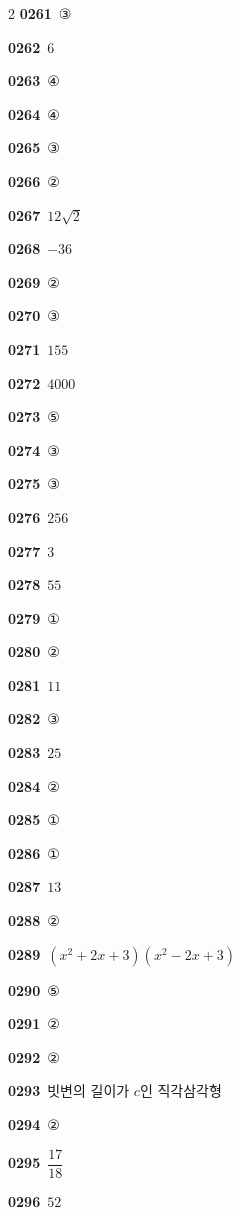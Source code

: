 \documentclass[10pt,a4paper]{article}
\begin{document}
\begin{multicols}{2}
\noindent\textbf{0261}\ ③\par
\noindent\textbf{0262}\ $6$\par
\noindent\textbf{0263}\ ④\par
\noindent\textbf{0264}\ ④\par
\noindent\textbf{0265}\ ③\par
\noindent\textbf{0266}\ ②\par
\noindent\textbf{0267}\ $12\sqrt{2}$\par
\noindent\textbf{0268}\ $-36$\par
\noindent\textbf{0269}\ ②\par
\noindent\textbf{0270}\ ③\par
\noindent\textbf{0271}\ $155$\par
\noindent\textbf{0272}\ $4000$\par
\noindent\textbf{0273}\ ⑤\par
\noindent\textbf{0274}\ ③\par
\noindent\textbf{0275}\ ③\par
\noindent\textbf{0276}\ $256$\par
\noindent\textbf{0277}\ $3$\par
\noindent\textbf{0278}\ $55$\par
\noindent\textbf{0279}\ ①\par
\noindent\textbf{0280}\ ②\par
\noindent\textbf{0281}\ $11$\par
\noindent\textbf{0282}\ ③\par
\noindent\textbf{0283}\ $25$\par
\noindent\textbf{0284}\ ②\par
\noindent\textbf{0285}\ ①\par
\noindent\textbf{0286}\ ①\par
\noindent\textbf{0287}\ $13$\par
\noindent\textbf{0288}\ ②\par
\noindent\textbf{0289}\ $(x^2+2x+3)(x^2-2x+3)$\par
\noindent\textbf{0290}\ ⑤\par
\noindent\textbf{0291}\ ②\par
\noindent\textbf{0292}\ ②\par
\noindent\textbf{0293}\ 빗변의 길이가 $c$인 직각삼각형\par
\noindent\textbf{0294}\ ②\par
\noindent\textbf{0295}\ $\dfrac{17}{18}$\par
\noindent\textbf{0296}\ $52$\par

\end{multicols}
\end{document}
